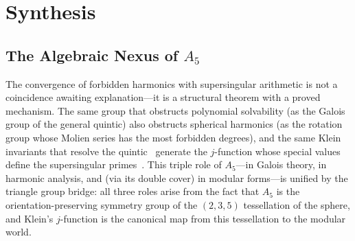 \documentclass[11pt,letterpaper]{article}
\theoremstyle{definition}
\begin{document}
\section{Synthesis}\label{sec:synthesis}
\subsection{The Algebraic Nexus of $A_5$}
The convergence of forbidden harmonics with supersingular arithmetic is not a coincidence awaiting explanation---it is a structural theorem with a proved mechanism.  The same group that obstructs polynomial solvability (as the Galois group of the general quintic) also obstructs spherical harmonics (as the rotation group whose Molien series has the most forbidden degrees), and the same Klein invariants that resolve the quintic~\cite{Klein1884} generate the $j$-function whose special values define the supersingular primes~\cite{Ogg1975}.  This triple role of $A_5$---in Galois theory, in harmonic analysis, and (via its double cover) in modular forms---is unified by the triangle group bridge: all three roles arise from the fact that $A_5$ is the orientation-preserving symmetry group of the $(2,3,5)$ tessellation of the sphere, and Klein's $j$-function is the canonical map from this tessellation to the modular world.
\end{document}
